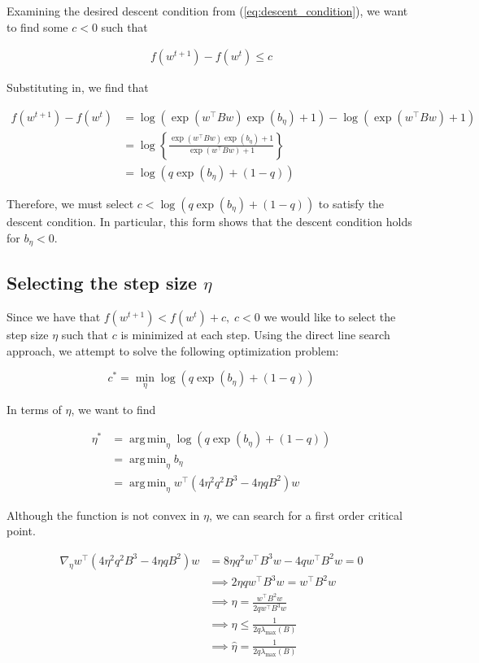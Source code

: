 \documentclass[11pt]{article}
\DeclareMathOperator*{\argmin}{arg\,min}
\begin{document}
Examining the desired descent condition from (\ref{eq:descent_condition}), we want to find some $c < 0$ such that

\begin{align*}
    f(w^{t+1}) - f(w^t) \leq c
\end{align*}

Substituting in, we find that

\begin{align*}
    f(w^{t+1}) - f(w^t) &= 
    \log(\exp(w^{\top}Bw)\exp(b_\eta ) + 1) - \log(\exp(w^{\top}Bw) + 1) \\
    &= \log \left\{ \frac{\exp(w^{\top}Bw)\exp(b_\eta ) + 1}{\exp(w^{\top}Bw) + 1} \right\} \\
    &= \log( q \exp(b_\eta ) + (1 - q))
\end{align*}

Therefore, we must select $c < \log( q \exp(b_\eta ) + (1 - q))$ to satisfy the descent condition. In particular, this form shows that the descent condition holds for $b_\eta < 0$.

\subsection{Selecting the step size $\eta$}

Since we have that $f(w^{t+1}) < f(w^t) + c, \; c < 0$ we would like to select the step size $\eta$ such that $c$ is minimized at each step. Using the direct line search approach, we attempt to solve the following optimization problem:

\begin{equation}
    c^* = \min_{\eta} \log( q \exp(b_\eta ) + (1 - q))
\end{equation}

In terms of $\eta$, we want to find

\begin{equation}
\label{eq:eta_opt}
\begin{split}
    \eta^* &= \argmin_{\eta} \log( q \exp(b_\eta ) + (1 - q)) \\
    &= \argmin_{\eta} b_\eta \\
    &= \argmin_{\eta} w^{\top} ( 4 \eta^2 q^2 B^3 - 4 \eta q B^2)w
\end{split}
\end{equation}

Although the function is not convex in $\eta$, we can search for a first order critical point.

\begin{align*}
\nabla_{\eta} w^{\top} ( 4 \eta^2 q^2 B^3 - 4 \eta q B^2)w 
&= 8 \eta q^2 w^{\top} B^3 w - 4 q w^{\top} B^2 w = 0 \\
&\implies 2 \eta q w^{\top} B^3 w = w^{\top} B^2 w \\
&\implies \eta = \frac{w^{\top} B^2 w}{2 q w^{\top} B^3 w} \\ 
&\implies \eta \leq \frac{1}{2q\lambda_{\max}(B)} \\
&\implies \hat{\eta} = \frac{1}{2q\lambda_{\max}(B)}
\end{align*}
\end{document}
